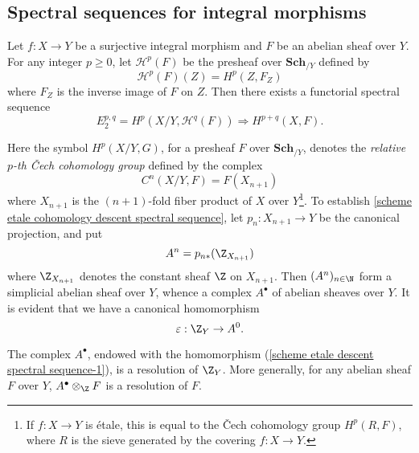 \subsection{Spectral sequences for integral morphisms}
\begin{proposition}\label{scheme etale cohomology descent spectral sequence}
Let $f:X\to Y$ be a surjective integral morphism and $F$ be an abelian sheaf over $Y$. For any integer $p\geq 0$, let $\mathcal{H}^p(F)$ be the presheaf over $\mathbf{Sch}_{/Y}$ defined by
\[\mathcal{H}^p(F)(Z)=H^p(Z,F_Z)\]
where $F_Z$ is the inverse image of $F$ on $Z$. Then there exists a functorial spectral sequence
\[E_2^{p,q}=H^p(X/Y,\mathcal{H}^q(F))\Rightarrow H^{p+q}(X,F).\]
\end{proposition}
Here the symbol $H^p(X/Y,G)$, for a presheaf $F$ over $\mathbf{Sch}_{/Y}$, denotes the \textit{relative $p$-th \v{C}ech cohomology group} defined by the complex 
\[C^n(X/Y,F)=F(X_{n+1})\]
where $X_{n+1}$ is the $(n+1)$-fold fiber product of $X$ over $Y$\footnote{If $f:X\to Y$ is \'etale, this is equal to the \v{C}ech cohomology group $H^p(R,F)$, where $R$ is the sieve generated by the covering $f:X\to Y$.}. To establish \cref{scheme etale cohomology descent spectral sequence}, let $p_n:X_{n+1}\to Y$ be the canonical projection, and put
\[A^n=p_{n*}(\Z_{X_{n+1}})\]
where $\Z_{X_{n+1}}$ denotes the constant sheaf $\Z$ on $X_{n+1}$. Then $(A^n)_{n\in\N}$ form a simplicial abelian sheaf over $Y$, whence a complex $A^\bullet$ of abelian sheaves over $Y$. It is evident that we have a canonical homomorphism
\begin{equation}\label{scheme etale descent spectral sequence-1}
\varepsilon:\Z_Y\to A^0.
\end{equation}
\begin{lemma}\label{scheme etale generalized Cech resolution}
The complex $A^\bullet$, endowed with the homomorphism (\ref{scheme etale descent spectral sequence-1}), is a resolution of $\Z_Y$. More generally, for any abelian sheaf $F$ over $Y$, $A^\bullet\otimes_\Z F$ is a resolution of $F$.
\end{lemma}
